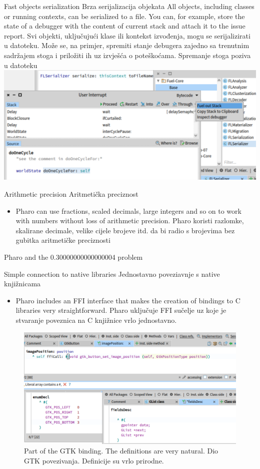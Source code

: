 \documentclass{beamer}
\begin{document}
\begin{frame}{Fast objects serialization Brza serijalizacija objekata}
All objects, including classes or running contexts, can be serialized to a file. You can, for example, store the state of a debugger with the content of current stack and attach it to the issue report.
Svi objekti, uključujući klase ili kontekst izvođenja, mogu se serijalizirati u datoteku. Može se, na primjer, spremiti stanje debugera zajedno sa trenutnim sadržajem stoga i priložiti ih uz izvješća o poteškoćama. 
Spremanje stoga poziva u datoteku \includegraphics[width=0.5\linewidth]{fuel.png}
\end{frame}

\begin{frame}{Arithmetic precision Aritmetička preciznost}%
\begin{itemize}
    \item Pharo can use fractions, scaled decimals, large integers and so on to work with numbers without loss of arithmetic precision.
    Pharo koristi razlomke, skalirane decimale, velike cijele brojeve itd. da bi radio s brojevima bez gubitka aritmetičke preciznosti
\end{itemize}
\begin{block}{}
Pharo and the 0.30000000000000004 problem
\end{block}
\end{frame}


\begin{frame}{Simple connection to native libraries Jednostavno poveziavnje s native knjižnicama}
\begin{itemize}
    \item Pharo includes an FFI interface that makes the creation of bindings to C libraries very straightforward.
    Pharo uključuje FFI sučelje uz koje je stvaranje poveznica na C knjižnice vrlo jednostavno. 
\end{itemize}
\begin{figure}
    \centering
    \includegraphics[width=0.5\linewidth]{ffi.png}
    \caption{Part of the GTK binding. The definitions are very natural.
Dio GTK povezivanja. Definicije su vrlo prirodne.}
    \label{fig:ffi}
\end{figure}
\end{frame}
\end{document}
